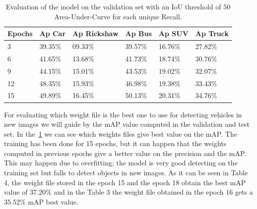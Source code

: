\begin{table}[!h]
  \centering
  \caption[Evaluation of the model]{Evaluation of the model on the validation set with an IoU threshold of 50%
Area-Under-Curve for each unique Recall. }
  \label{tab:class-ap}
  {\renewcommand{\arraystretch}{1.7}
    \begin{tabular}{p{1.5cm} p{1.5cm} p{1.5cm} p{1.5cm} p{1.5cm} p{1.5cm}}
          \toprule
          Epochs & Ap Car & Ap Rickshaw & Ap  Bus & Ap SUV & Ap Truck \\
          \hline
          3 & 39.35\% & 09.33\% & 39.57\% & 16.76\% & 27.82\% \\
          6 & 41.65\% & 13.68\% & 41.73\% & 18.74\% & 30.76\% \\ 
          9 & 44.15\% & 15.01\% & 43.53\% & 19.02\% & 32.07\% \\
          12 & 48.35\% & 15.93\% & 46.98\% & 19.38\% & 33.43\% \\
          15 & 49.89\% & 16.45\% & 50.13\% & 20.31\% & 34.76\% \\
          \bottomrule
    \end{tabular}
  }
\end{table}

For evaluating which weight file is the best one to use for detecting vehicles in new images we 
will guide by the mAP value computed in the validation and test set. In the~\ref{tab:class-ap} we can 
see which weights files give best value on the mAP. The training has been done for 15 epochs, 
but  it  can  happen  that  the  weights  computed  in  previous  epochs  give  a  better  value  on  the 
precision and the mAP. This may happen due to overfitting; the model is very good detecting on 
the training set but falls to detect objects in new images. As it can be seen in Table 4, the weight 
file  stored in the epoch 15 and the epoch 18 obtain the  best mAP value of 37.20\% and in the 
Table 3 the weight file obtained in the epoch 16 gets a 35.52\% mAP best value.  

